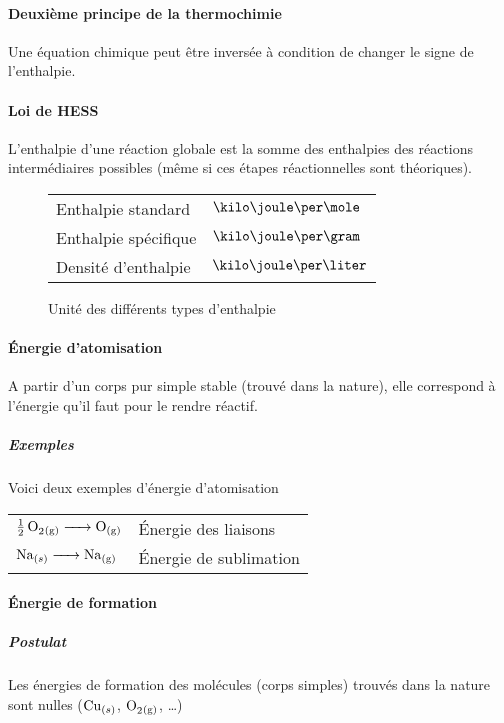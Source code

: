 \documentclass[11pt,a4paper,french]{article}
\begin{document}
\paragraph{Deuxième principe de la thermochimie}
Une équation chimique peut être inversée à condition de changer le signe de l'enthalpie.

\paragraph{Loi de HESS}
L'enthalpie d'une réaction globale est la somme des enthalpies des réactions intermédiaires possibles (même si ces étapes réactionnelles sont théoriques).

\begin{figure}[h!]
	\begin{center}
		\begin{tabular}{|ll|}
			\hline
			Enthalpie standard & $\kilo\joule\per\mole$\\
			Enthalpie spécifique & $\kilo\joule\per\gram$\\
			Densité d'enthalpie & $\kilo\joule\per\liter$\\
			\hline
		\end{tabular}
	\end{center}
	\label{fig:enthunit}
	\caption{Unité des différents types d'enthalpie}
\end{figure}

\paragraph{\'Energie d'atomisation}
A partir d'un corps pur simple stable (trouvé dans la nature), elle correspond à l'énergie qu'il faut pour le rendre réactif.

\subparagraph{Exemples}
Voici deux exemples d'énergie d'atomisation
\begin{center}
	\begin{tabular}{ll}
		$\ce{1/2O2\gaz} \ce{-> O\gaz}$ & \'Energie des liaisons\\
		$\ce{Na}_{(s)} \ce{-> Na\gaz}$ & \'Energie de sublimation
	\end{tabular}
\end{center}

\paragraph{\'Energie de formation}
\subparagraph{Postulat}
Les énergies de formation des molécules (corps simples) trouvés dans la nature sont nulles ($\ce{Cu}_{(s)}$, $\ce{O2\gaz}$, \ldots)
\end{document}
